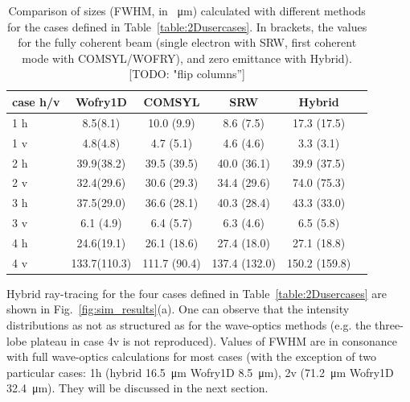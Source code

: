\documentclass{iucr}              %
\newcommand{\todo}[1]{{\color{red}[TODO: "#1'']}}
\begin{document}

\newpage

\twocolumn


\begin{table}[]
    \label{table:comparison}
    \caption{Comparison of sizes (FWHM, in \SI{}{\micro\meter}) calculated with different methods for the cases defined in Table~\ref{table:2Dusercases}.
    In brackets, the values for the fully coherent beam (single electron with SRW, first coherent mode with COMSYL/WOFRY), and zero emittance with Hybrid). \todo{flip columns}
    }
    \centering
    \begin{tabular}{p{}|c|c|c|c|c}
         case h/v &
         Wofry1D&
         COMSYL&
         SRW&
         Hybrid \\
         \hline
1 h  & 8.5(8.1)    & 10.0 (9.9)  & 8.6 (7.5)   & 17.3 (17.5) \\
1 v  & 4.8(4.8)    & 4.7 (5.1)   & 4.6 (4.6)   & 3.3 (3.1) \\
\hline
2 h  & 39.9(38.2)  & 39.5 (39.5) & 40.0 (36.1)  & 39.9 (37.5) \\
2 v  & 32.4(29.6)  & 30.6 (29.3) & 34.4 (29.6)  & 74.0 (75.3) \\
\hline
3 h  & 37.5(29.0)  & 36.6 (28.1) & 40.3 (28.4)  & 43.3 (33.0) \\
3 v  & 6.1 (4.9)   & 6.4 (5.7)   & 6.3 (4.6)    & 6.5 (5.8) \\
\hline
4 h  & 24.6(19.1)  & 26.1 (18.6)  & 27.4 (18.0)   & 27.1 (18.8) \\
4 v  & 133.7(110.3)& 111.7 (90.4) & 137.4 (132.0) & 150.2 (159.8) \\
    \end{tabular}
\end{table}

Hybrid ray-tracing for the four cases defined in Table~\ref{table:2Dusercases} are shown in  Fig.~\ref{fig:sim_results}(a). One can observe that the intensity distributions as not as structured as for the wave-optics methods (e.g. the three-lobe plateau in case 4v is not reproduced). Values of FWHM are in consonance with full wave-optics calculations for most cases (with the exception of two particular cases:
1h (hybrid \SI{16.5}{\micro\meter} Wofry1D \SI{8.5}{\micro\meter}),
2v (\SI{71.2}{\micro\meter} Wofry1D \SI{32.4}{\micro\meter}). They will be discussed in the next section.
\end{document}
